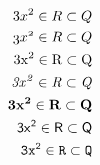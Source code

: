 \documentclass{article}
\begin{document}
\begin{align*}
3x^2 \in R \subset Q \\
\mathnormal{3x^2 \in R \subset Q} \\
\mathrm{3x^2 \in R \subset Q} \\
\mathit{3x^2 \in R \subset Q} \\
\mathbf{3x^2 \in R \subset Q} \\
\mathsf{3x^2 \in R \subset Q} \\
\mathtt{3x^2 \in R \subset Q} 
\end{align*}
\end{document}

